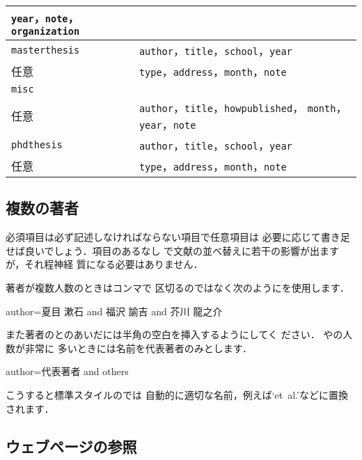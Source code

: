 \begin{table}[htbp]
\begin{center}
\begin{tabular}{lp{50ex}}
 \texttt{year}，\texttt{note}，\texttt{organization} \\
\hline
%
\texttt{masterthesis}  & 
 \texttt{author}，\texttt{title}，\texttt{school}，\texttt{year}\\
任意                & 
 \texttt{type}，\texttt{address}，\texttt{month}，\texttt{note} \\
\hline
%
\texttt{misc}          & \\
任意                & 
 \texttt{author}，\texttt{title}，\texttt{howpublished}，
 \texttt{month}，\texttt{year}，\texttt{note} \\
\hline
%
\texttt{phdthesis}  & 
 \texttt{author}，\texttt{title}，\texttt{school}，\texttt{year}\\
任意                &
 \texttt{type}，\texttt{address}，\texttt{month}，\texttt{note} \\
\hline
\end{tabular}
\end{center}
\end{table}

\subsection{複数の著者}

必須項目は必ず記述しなければならない項目で任意項目は
必要に応じて書き足せば良いでしょう．項目のあるなし
で文献の並べ替えに若干の影響が出ますが，それ程神経
質になる必要はありません．

著者が複数人数のときはコンマで
区切るのではなく次のようにを使用します．

\begin{intext}
author={夏目 漱石 and 福沢 諭吉 and 芥川 龍之介}
\end{intext}

また著者のとのあいだには半角の空白を挿入するようにしてく
ださい．
やの人数が非常に
多いときには名前を代表著者のみとします．

\begin{intext}
author={代表著者 and others}
\end{intext}

こうすると標準スタイルのでは
自動的に適切な名前，例えば`et~al.'などに置換されます．

\subsection{ウェブページの参照}

